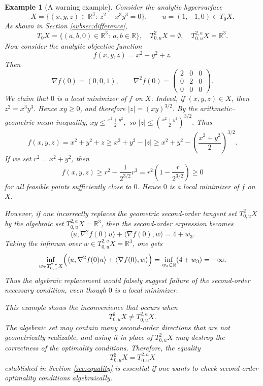 \documentclass[10pt,reqno]{amsart}
\theoremstyle{break-italic}
\theoremstyle{break-italic}
\theoremstyle{break-italic}
\theoremstyle{break-italic}
\theoremstyle{break-italic}
\theoremstyle{break-italic}
\theoremstyle{break-italic}
\theoremstyle{break-italic}
\theoremstyle{break-roman}
\newtheorem{example}[satz]{Example}
\theoremstyle{standard}
\theoremstyle{varthm-roman}
\theoremstyle{varthm-italic}
\theoremstyle{varthm-roman-break}
\theoremstyle{varthm-italic-break}
\theoremstyle{varthm-roman-no-punctuation}
\theoremstyle{varthm-italic-no-punctuation}
\numberwithin{equation}{section}
\begin{document}
\begin{example}[A warning example]
\label{ex:opt-warning}
Consider the analytic hypersurface
\[
X=\{(x,y,z)\in\mathbb R^3:\ z^2-x^3y^3=0\},
\qquad
u=(1,-1,0)\in T_0X.
\]
As shown in Section \ref{subsec:difference},
\[
T_0X=\{(a,b,0)\in\mathbb R^3:\ a,b\in\mathbb R\},
\quad
T^2_{0,u}X=\emptyset,
\quad
T^{2,a}_{0,u}X=\mathbb R^3.
\]
Now consider the analytic objective function
\[
f(x,y,z)=x^2+y^2+z.
\]
Then
\[
\nabla f(0)=(0,0,1),\qquad
\nabla^2 f(0)=
\begin{pmatrix}
2&0&0\\
0&2&0\\
0&0&0
\end{pmatrix}.
\]
We claim that $0$ is a local minimizer of $f$ on $X$. Indeed, if
$(x,y,z)\in X$, then
\(
z^2=x^3y^3.
\)
Hence $xy\ge 0$, and therefore
\(
|z|=(xy)^{3/2}.
\)
By the arithmetic--geometric mean inequality,
\(
xy\le \frac{x^2+y^2}{2},
\)
so
\(
|z|\le \left(\frac{x^2+y^2}{2}\right)^{3/2}.
\)
Thus
\[
f(x,y,z)=x^2+y^2+z
\ge
x^2+y^2-|z|
\ge
x^2+y^2-\left(\frac{x^2+y^2}{2}\right)^{3/2}.
\]
If we set \(r^2=x^2+y^2\), then
\[
f(x,y,z)\ge r^2-\frac{1}{2^{3/2}}r^3
= r^2\left(1-\frac{r}{2^{3/2}}\right)\ge 0
\]
for all feasible points sufficiently close to $0$. Hence $0$ is a local
minimizer of $f$ on $X$.

However, if one incorrectly replaces the geometric second-order tangent set
$T^2_{0,u}X$ by the algebraic set $T^{2,a}_{0,u}X=\mathbb R^3$, then the
second-order expression becomes
\[
\langle u,\nabla^2 f(0)u\rangle+\langle \nabla f(0),w\rangle
=
4+w_3.
\]
Taking the infimum over \(w\in T^{2,a}_{0,u}X=\mathbb R^3\), one gets
\[
\inf_{w\in T^{2,a}_{0,u}X}
\Bigl(
\langle u,\nabla^2 f(0)u\rangle+\langle \nabla f(0),w\rangle
\Bigr)
=
\inf_{w_3\in\mathbb R}(4+w_3)
=
-\infty.
\]
Thus the algebraic replacement would falsely suggest failure of the
second-order necessary condition, even though $0$ is a local minimizer.

This example shows the inconvenience that occurs when
\[
T^2_{0,u}X\neq T^{2,a}_{0,u}X.
\]
The algebraic set may contain many second-order directions that are not
geometrically realizable, and using it in place of $T^2_{0,u}X$ may destroy the
correctness of the optimality conditions. Therefore, the equality
\[
T^2_{0,u}X=T^{2,a}_{0,u}X
\]
established in Section \ref{sec:equality} is essential if one wants to check second-order
optimality conditions algebraically.
\end{example}


\end{document}
